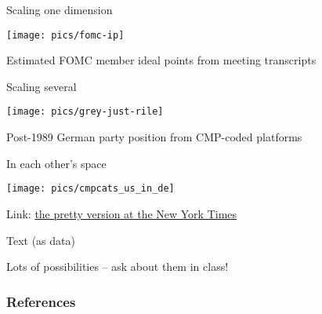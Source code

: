\documentclass{hertieteaching}
\begin{document}
\begin{frame}{Scaling one dimension}

\centerline{\texttt{[image: pics/fomc-ip]}}
Estimated FOMC member ideal points from meeting transcripts  \textcite{Baerg.Lowe2020}

\end{frame}

\begin{frame}{Scaling several}
\vspace{-1em}
\centerline{\texttt{[image: pics/grey-just-rile]}}
Post-1989 German party position from CMP-coded platforms

\end{frame}

\begin{frame}{In each other's space}
\medskip
\centerline{\texttt{[image: pics/cmpcats\_us\_in\_de]}}
Link: \href{https://www.nytimes.com/interactive/2019/06/26/opinion/sunday/republican-platform-far-right.html}{the pretty version at the New York Times}

\end{frame}

\begin{frame}{Text (as data)}

Lots of possibilities -- ask about them in class!
	
\end{frame}

\begin{frame}[allowframebreaks]
\frametitle{References}
\printbibliography	
\end{frame}
\end{document}

